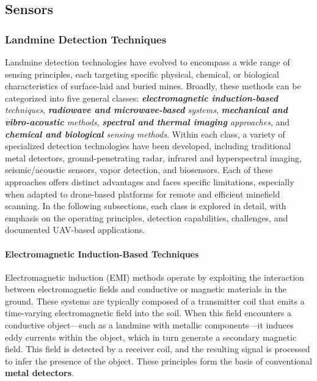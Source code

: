 \subsection{Sensors}

\subsubsection{Landmine Detection Techniques}

Landmine detection technologies have evolved to encompass a wide range of sensing principles, each targeting specific physical, chemical, or biological characteristics of surface-laid and buried mines. Broadly, these methods can be categorized into five general classes: \textit{\textbf{electromagnetic induction-based} techniques}, \textit{\textbf{radiowave and microwave-based} systems}, \textit{\textbf{mechanical and vibro-acoustic} methods}, \textit{\textbf{spectral and thermal imaging} approaches}, and \textit{\textbf{chemical and biological} sensing methods}. Within each class, a variety of specialized detection technologies have been developed, including traditional metal detectors, ground-penetrating radar, infrared and hyperspectral imaging, seismic/acoustic sensors, vapor detection, and biosensors. Each of these approaches offers distinct advantages and faces specific limitations, especially when adapted to drone-based platforms for remote and efficient minefield scanning. In the following subsections, each class is explored in detail, with emphasis on the operating principles, detection capabilities, challenges, and documented UAV-based applications.

\paragraph{Electromagnetic Induction-Based Techniques}

Electromagnetic induction (EMI) methods operate by exploiting the interaction between electromagnetic fields and conductive or magnetic materials in the ground. These systems are typically composed of a transmitter coil that emits a time-varying electromagnetic field into the soil. When this field encounters a conductive object—such as a landmine with metallic components—it induces eddy currents within the object, which in turn generate a secondary magnetic field. This field is detected by a receiver coil, and the resulting signal is processed to infer the presence of the object. These principles form the basis of conventional \textbf{metal detectors}.

